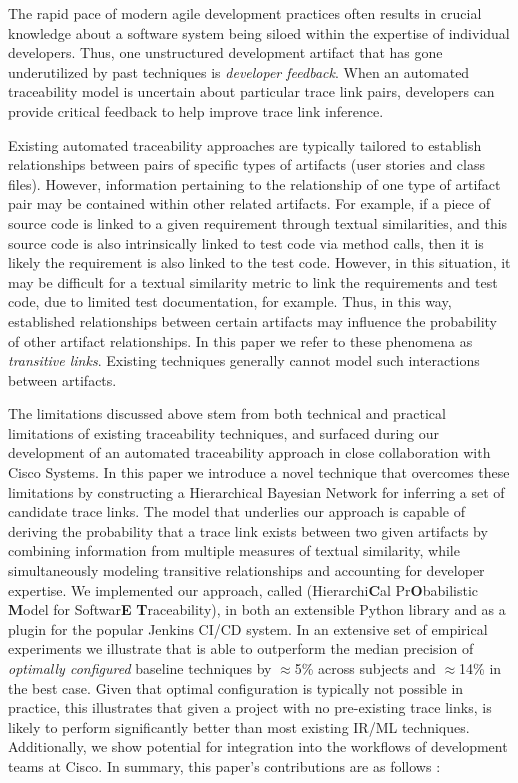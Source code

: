  The rapid pace of modern agile development practices often results in crucial knowledge about a software system being siloed within the expertise of individual developers. Thus, one unstructured development artifact that has gone underutilized by past techniques is \textit{developer feedback}. When an automated traceability model is uncertain about particular trace link pairs, developers can provide critical feedback to help improve trace link inference.

Existing automated traceability approaches are typically tailored to establish relationships between pairs of specific types of artifacts (\eg user stories and class files). However, information pertaining to the relationship of one type of artifact pair may be contained within other related artifacts. For example, if a piece of source code is linked to a given requirement through textual similarities, and this source code is also intrinsically linked to test code via method calls, then it is likely the requirement is also linked to the test code. However, in this situation, it may be difficult for a textual similarity metric to link the requirements and test code, due to limited test documentation, for example. Thus, in this way, established relationships between certain artifacts may influence the probability of other artifact relationships. In this paper we refer to these phenomena as \textit{transitive links}. Existing techniques generally cannot model such interactions between artifacts.

The limitations discussed above stem from both technical and practical limitations of existing traceability techniques, and surfaced during our development of an automated traceability approach in close collaboration with Cisco Systems. In this paper we introduce a novel technique that overcomes these limitations by constructing a Hierarchical Bayesian Network for inferring a set of candidate trace links. The model that underlies our approach is capable of deriving the probability that a trace link exists between two given artifacts by combining information from multiple measures of textual similarity, while simultaneously modeling transitive relationships and accounting for developer expertise.  We implemented our approach, called \Comet (Hierarchi\textbf{C}al Pr\textbf{O}babilistic \textbf{M}odel for Softwar\textbf{E} \textbf{T}raceability), in both an extensible Python library and as a plugin for the popular Jenkins CI/CD system.  In an extensive set of empirical experiments we illustrate that \Comet is able to outperform the median precision of \textit{optimally configured} baseline techniques by $\approx$5\% across subjects and $\approx$14\% in the best case. Given that optimal configuration is typically not possible in practice, this illustrates that given a project with no pre-existing trace links, \Comet is likely to perform significantly better than most existing IR/ML techniques. Additionally, we show \Comets potential for integration into the workflows of development teams at Cisco. In summary, this paper's contributions are as follows :

